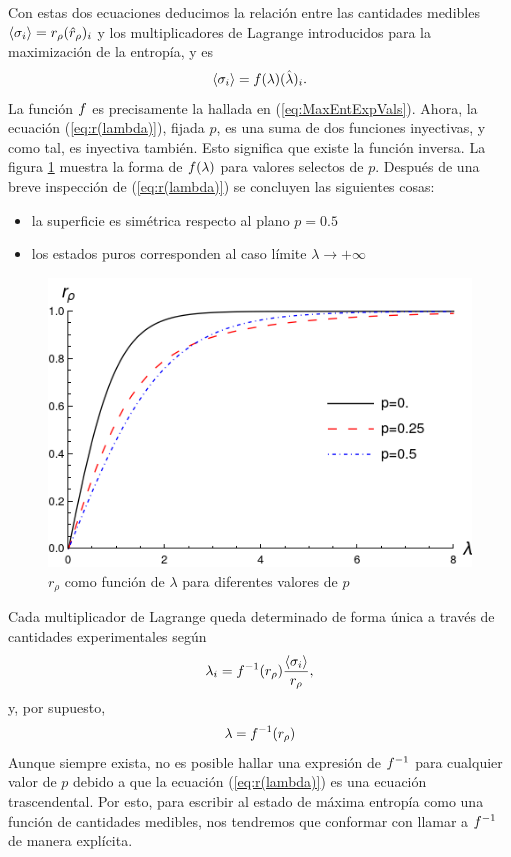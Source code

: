 Con estas dos ecuaciones deducimos la relación entre las cantidades medibles $\expval{\sigma_{i}}=r_{\rho}(\hat{r}_{\rho})_{i}$ y los multiplicadores de Lagrange introducidos para la maximización de la entropía, y es
\begin{equation}
    \expval{\sigma_{i}}=f(\lambda)(\hat{\lambda})_{i}.
\end{equation}
La función $f$ es precisamente la hallada en (\ref{eq:MaxEntExpVals}). Ahora, la ecuación (\ref{eq:r(lambda)}), fijada $p$, es una suma de dos funciones inyectivas, y como tal, es inyectiva también. Esto significa que existe la función inversa. La figura \ref{fig:r(lambda)} muestra la forma de $f(\lambda)$ para valores selectos de $p$. Después de una breve inspección de (\ref{eq:r(lambda)}) se concluyen las siguientes cosas:
\begin{itemize}
\item la superficie es simétrica respecto al plano $p=0.5$
\item los estados puros corresponden al caso límite $\lambda\rightarrow+\infty$
\end{itemize}
\begin{figure}[ht]
    \centering
    \includegraphics[width=0.6\linewidth]{chapter2/figures/r(lambda).png}
    \caption{$r_{\rho}$ como función de $\lambda$ para diferentes valores de $p$}
    \label{fig:r(lambda)}
\end{figure}
Cada multiplicador de Lagrange queda determinado de forma única a través de cantidades experimentales según 
\begin{equation}
    \lambda_{i}=f^{-1}(r_{\rho}) \frac{\expval{\sigma_{i}}}{r_{\rho}},
\end{equation}
y, por supuesto,
\begin{equation*}
    \lambda=f^{-1}(r_{\rho})
\end{equation*}
Aunque siempre exista, no es posible hallar una expresión de $f^{-1}$ para cualquier valor de $p$ debido a que la ecuación (\ref{eq:r(lambda)}) es una ecuación trascendental. Por esto, para escribir al estado de máxima entropía como una función de cantidades medibles, nos tendremos que conformar con llamar a $f^{-1}$ de manera explícita.


